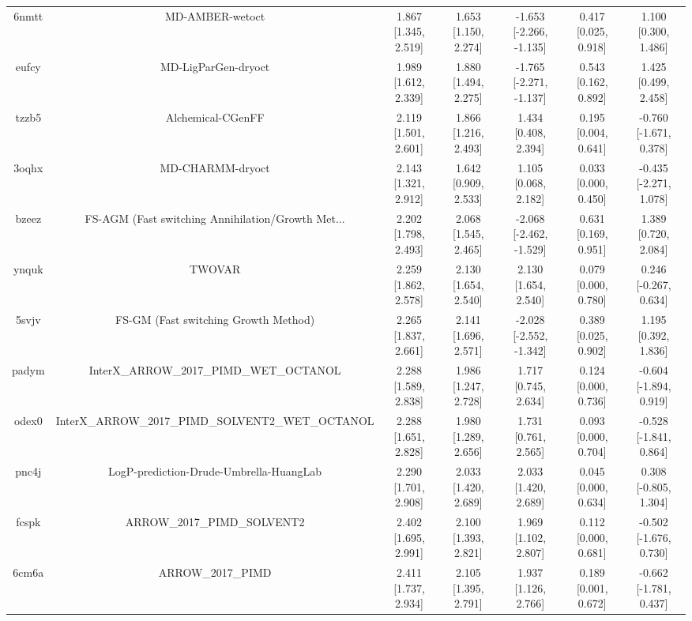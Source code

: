 \documentclass{article}
\begin{document}
\begin{center}
\begin{longtable}{|ccccccc|}
 6nmtt &                                    MD-AMBER-wetoct &  1.867 [1.345, 2.519] &  1.653 [1.150, 2.274] &  -1.653 [-2.266, -1.135] &  0.417 [0.025, 0.918] &    1.100 [0.300, 1.486] \\
 eufcy &                                MD-LigParGen-dryoct &  1.989 [1.612, 2.339] &  1.880 [1.494, 2.275] &  -1.765 [-2.271, -1.137] &  0.543 [0.162, 0.892] &    1.425 [0.499, 2.458] \\
 tzzb5 &                                  Alchemical-CGenFF &  2.119 [1.501, 2.601] &  1.866 [1.216, 2.493] &     1.434 [0.408, 2.394] &  0.195 [0.004, 0.641] &  -0.760 [-1.671, 0.378] \\
 3oqhx &                                   MD-CHARMM-dryoct &  2.143 [1.321, 2.912] &  1.642 [0.909, 2.533] &     1.105 [0.068, 2.182] &  0.033 [0.000, 0.450] &  -0.435 [-2.271, 1.078] \\
 bzeez &  FS-AGM (Fast switching Annihilation/Growth Met... &  2.202 [1.798, 2.493] &  2.068 [1.545, 2.465] &  -2.068 [-2.462, -1.529] &  0.631 [0.169, 0.951] &    1.389 [0.720, 2.084] \\
 ynquk &                                             TWOVAR &  2.259 [1.862, 2.578] &  2.130 [1.654, 2.540] &     2.130 [1.654, 2.540] &  0.079 [0.000, 0.780] &   0.246 [-0.267, 0.634] \\
 5svjv &               FS-GM (Fast switching Growth Method) &  2.265 [1.837, 2.661] &  2.141 [1.696, 2.571] &  -2.028 [-2.552, -1.342] &  0.389 [0.025, 0.902] &    1.195 [0.392, 1.836] \\
 padym &            InterX\_ARROW\_2017\_PIMD\_WET\_OCTANOL &  2.288 [1.589, 2.838] &  1.986 [1.247, 2.728] &     1.717 [0.745, 2.634] &  0.124 [0.000, 0.736] &  -0.604 [-1.894, 0.919] \\
 odex0 &  InterX\_ARROW\_2017\_PIMD\_SOLVENT2\_WET\_OCTANOL &  2.288 [1.651, 2.828] &  1.980 [1.289, 2.656] &     1.731 [0.761, 2.565] &  0.093 [0.000, 0.704] &  -0.528 [-1.841, 0.864] \\
 pnc4j &            LogP-prediction-Drude-Umbrella-HuangLab &  2.290 [1.701, 2.908] &  2.033 [1.420, 2.689] &     2.033 [1.420, 2.689] &  0.045 [0.000, 0.634] &   0.308 [-0.805, 1.304] \\
 fcspk &                        ARROW\_2017\_PIMD\_SOLVENT2 &  2.402 [1.695, 2.991] &  2.100 [1.393, 2.821] &     1.969 [1.102, 2.807] &  0.112 [0.000, 0.681] &  -0.502 [-1.676, 0.730] \\
 6cm6a &                                  ARROW\_2017\_PIMD &  2.411 [1.737, 2.934] &  2.105 [1.395, 2.791] &     1.937 [1.126, 2.766] &  0.189 [0.001, 0.672] &  -0.662 [-1.781, 0.437] \\

\end{longtable}
\end{center}
\end{document}
